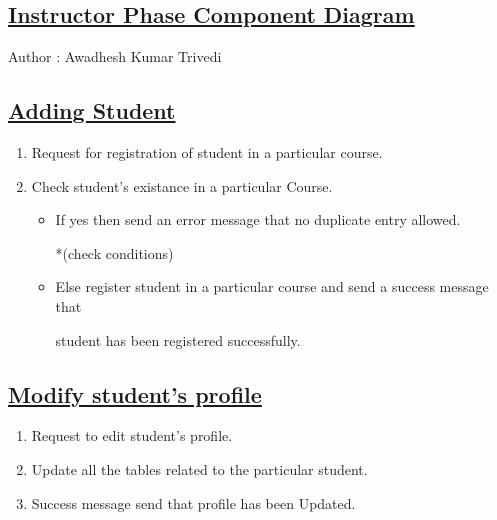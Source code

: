 \documentclass{article}
\begin{document}
\begin{center}
\section*{\underline{Instructor Phase Component Diagram}}
                               Author : Awadhesh Kumar Trivedi      
\end{center}
	\subsection*{\underline{Adding Student}}
\begin{enumerate}	
\item Request for registration of student in a particular course.

	\item Check student's existance in a particular Course.
\begin{itemize}
	\item If yes then send an error message that no duplicate entry allowed.

                     *(check conditions) 
	\item Else register student in a particular course and send a success message that 

        	student has been registered successfully.
\end{itemize}
\begin{center}        

\end{center}
\end{enumerate}
\subsection*{\underline{Modify student's profile}}
\begin{enumerate}
	\item Request to edit student's profile.

	\item Update all the tables related to the particular student.

	\item Success message send that profile has been Updated.

\begin{center}

\end{center}
\end{enumerate}
\end{document}
